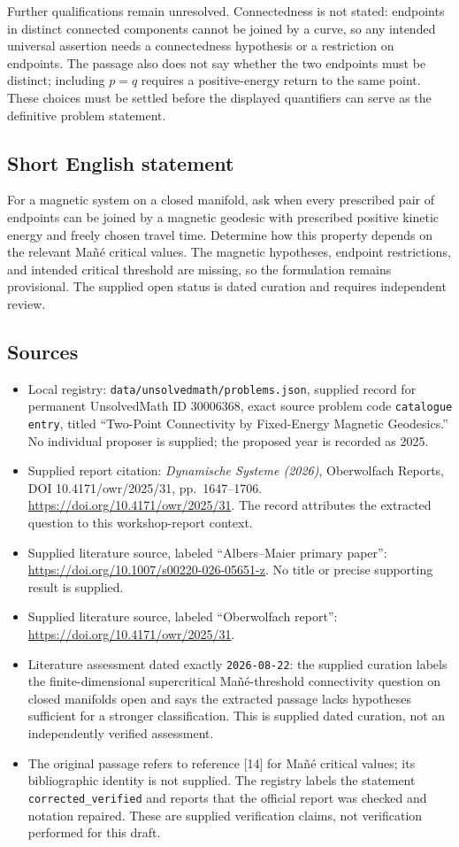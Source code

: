 \documentclass[11pt]{article}
\begin{document}
Further qualifications remain unresolved. Connectedness is not stated: endpoints in distinct connected components cannot be joined by a curve, so any intended universal assertion needs a connectedness hypothesis or a restriction on endpoints. The passage also does not say whether the two endpoints must be distinct; including \(p=q\) requires a positive-energy return to the same point. These choices must be settled before the displayed quantifiers can serve as the definitive problem statement.
\subsection{Short English statement}
For a magnetic system on a closed manifold, ask when every prescribed pair of endpoints can be joined by a magnetic geodesic with prescribed positive kinetic energy and freely chosen travel time. Determine how this property depends on the relevant Ma\~n\'e critical values. The magnetic hypotheses, endpoint restrictions, and intended critical threshold are missing, so the formulation remains provisional. The supplied open status is dated curation and requires independent review.
\subsection{Sources}
\begin{itemize}
\item Local registry: \texttt{data/unsolvedmath/problems.json}, supplied record for permanent UnsolvedMath ID \(30006368\), exact source problem code \texttt{catalogue entry}, titled ``Two-Point Connectivity by Fixed-Energy Magnetic Geodesics.'' No individual proposer is supplied; the proposed year is recorded as 2025.
\item Supplied report citation: \emph{Dynamische Systeme (2026)}, Oberwolfach Reports, DOI 10.4171/owr/2025/31, pp.\ 1647--1706. \url{https://doi.org/10.4171/owr/2025/31}. The record attributes the extracted question to this workshop-report context.
\item Supplied literature source, labeled ``Albers--Maier primary paper'': \url{https://doi.org/10.1007/s00220-026-05651-z}. No title or precise supporting result is supplied.
\item Supplied literature source, labeled ``Oberwolfach report'': \url{https://doi.org/10.4171/owr/2025/31}.
\item Literature assessment dated exactly \texttt{2026-08-22}: the supplied curation labels the finite-dimensional supercritical Ma\~n\'e-threshold connectivity question on closed manifolds open and says the extracted passage lacks hypotheses sufficient for a stronger classification. This is supplied dated curation, not an independently verified assessment.
\item The original passage refers to reference [14] for Ma\~n\'e critical values; its bibliographic identity is not supplied. The registry labels the statement \texttt{corrected\_verified} and reports that the official report was checked and notation repaired. These are supplied verification claims, not verification performed for this draft.
\end{itemize}
\end{document}
